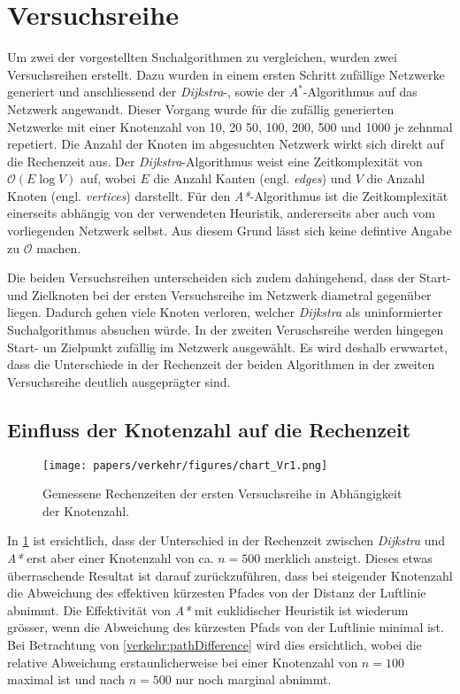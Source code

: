 \section{Versuchsreihe}
\label{section:verkehr/versuchsreihe}

Um zwei der vorgestellten Suchalgorithmen zu vergleichen, wurden zwei Versuchsreihen erstellt. Dazu wurden in einem ersten Schritt zufällige Netzwerke generiert und anschliessend der \emph{Dijkstra}-, sowie der \emph{$A^*$}-Algorithmus auf das Netzwerk angewandt.
Dieser Vorgang wurde für die zufällig generierten Netzwerke mit einer Knotenzahl von 10, 20 50, 100, 200, 500 und 1000 je zehnmal repetiert.
Die Anzahl der Knoten im abgesuchten Netzwerk wirkt sich direkt auf die Rechenzeit aus. Der \emph{Dijkstra}-Algorithmus weist eine Zeitkomplexität von $\mathcal{O}(E\log{}V)$ auf, wobei $E$ die Anzahl Kanten (engl. \emph{edges}) und $V$ die Anzahl Knoten (engl. \emph{vertices}) darstellt.
Für den \emph{A*}-Algorithmus ist die Zeitkomplexität einerseits abhängig von der verwendeten Heuristik, andererseits aber auch vom vorliegenden Netzwerk selbst. Aus diesem Grund lässt sich keine defintive Angabe zu $\mathcal{O}$ machen.

Die beiden Versuchsreihen unterscheiden sich zudem dahingehend, dass der Start- und Zielknoten bei der ersten Versuchsreihe im Netzwerk diametral gegenüber liegen. Dadurch gehen viele Knoten verloren, welcher \emph{Dijkstra} als uninformierter Suchalgorithmus absuchen würde. In der zweiten Veruschsreihe werden hingegen Start- un Zielpunkt zufällig im Netzwerk ausgewählt. Es wird deshalb erwwartet, dass die Unterschiede in der Rechenzeit der beiden Algorithmen in der zweiten Versuchsreihe deutlich ausgeprägter sind.

\subsection{Einfluss der Knotenzahl auf die Rechenzeit}
\label{verkehr:Knotenzahl}

\begin{figure}
\centering
\texttt{[image: papers/verkehr/figures/chart\_Vr1.png]}

\caption{Gemessene Rechenzeiten der ersten Versuchsreihe in Abhängigkeit der Knotenzahl.}
\label{verkehr:Vr1}
\end{figure}

In \ref{verkehr:Vr1} ist ersichtlich, dass der Unterschied in der Rechenzeit zwischen \emph{Dijkstra} und \emph{A*} erst aber einer Knotenzahl von ca. $n=500$ merklich ansteigt. Dieses etwas überraschende Resultat ist darauf zurückzuführen, dass bei steigender Knotenzahl die Abweichung des effektiven kürzesten Pfades von der Distanz der Luftlinie abnimmt.
Die Effektivität von \emph{A*} mit euklidischer Heuristik ist wiederum grösser, wenn die Abweichung des kürzesten Pfads von der Luftlinie minimal ist.
Bei Betrachtung von \ref{verkehr:pathDifference} wird dies ersichtlich, wobei die relative Abweichung erstaunlicherweise bei einer Knotenzahl von $n=100$ maximal ist und nach $n=500$ nur noch marginal abnimmt.

